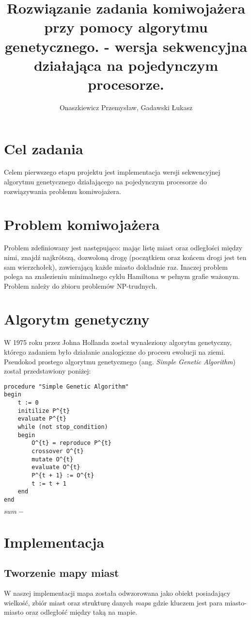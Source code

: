 \documentclass[10pt,a4paper]{article}
\author{Onaszkiewicz Przemysław, Gadawski Łukasz}
\title{Rozwiązanie zadania komiwojażera przy pomocy algorytmu genetycznego. - wersja sekwencyjna działająca na pojedynczym procesorze.}
\begin{document}
\maketitle

\section{Cel zadania}
Celem pierwszego etapu projektu jest implementacja wersji sekwencyjnej algorytmu genetycznego działającego na pojedynczym procesorze do rozwiązywania problemu komiwojażera.

\section{Problem komiwojażera}
Problem zdefiniowany jest następująco: mając listę miast oraz odległości między nimi, znajdź najkrótszą, dozwoloną drogę (początkiem oraz końcem drogi jest ten sam wierzchołek), zawierającą każde miasto dokładnie raz. Inaczej problem polega na znalezieniu minimalnego cyklu Hamiltona w pełnym grafie ważonym. Problem należy do zbioru problemów NP-trudnych.

\section{Algorytm genetyczny}
W 1975 roku przez Johna Hollanda został wynaleziony algorytm genetyczny, którego zadaniem było działanie analogiczne do procesu ewolucji na ziemi. Pseudokod prostego algorytmu genetycznego (ang. \textit{Simple Genetic Algorithm}) został przedstawiony poniżej:
\begin{verbatim}
procedure "Simple Genetic Algorithm"
begin 
	t := 0
	initilize P^{t}
	evaluate P^{t}
	while (not stop_condition)
	begin
		O^{t} = reproduce P^{t}
		crossover O^{t}
		mutate O^{t}
		evaluate O^{t}
		P^{t + 1} := O^{t}
		t := t + 1
	end
end
\end{verbatim}

$sum - $

\section{Implementacja}

\subsection{Tworzenie mapy miast}
W naszej implementacji mapa została odwzorowana jako obiekt posiadający wielkość, zbiór miast oraz strukturę danych \textit{mapa} gdzie kluczem jest para miasto-miasto oraz odległość między taką na mapie.
\end{document}
